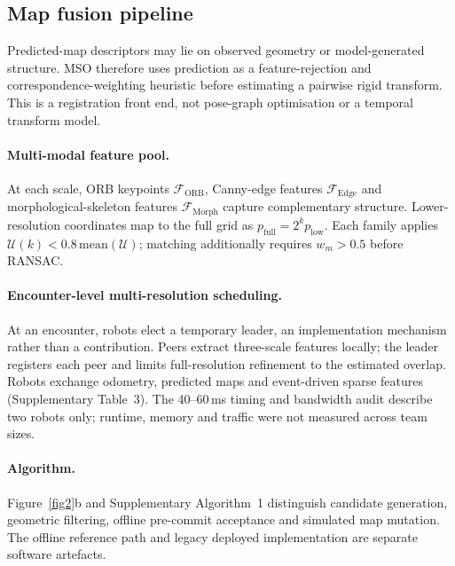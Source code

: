 \documentclass[11pt]{article}
\begin{document}
\subsection{Map fusion pipeline} \label{app:fusion}

Predicted-map descriptors may lie on observed geometry or model-generated structure. MSO therefore uses prediction as a feature-rejection and correspondence-weighting heuristic before estimating a pairwise rigid transform. This is a registration front end, not pose-graph optimisation or a temporal transform model.

\paragraph{Multi-modal feature pool.}
At each scale, ORB keypoints $\mathcal{F}_{\text{ORB}}$, Canny-edge features $\mathcal{F}_{\text{Edge}}$ and morphological-skeleton features $\mathcal{F}_{\text{Morph}}$ capture complementary structure. Lower-resolution coordinates map to the full grid as $p_{\text{full}}=2^{k}p_{\text{low}}$. Each family applies $\mathcal{U}(k)<0.8\,\mathrm{mean}(\mathcal{U})$; matching additionally requires $w_m>0.5$ before RANSAC.

\paragraph{Encounter-level multi-resolution scheduling.}
At an encounter, robots elect a temporary leader, an implementation mechanism rather than a contribution. Peers extract three-scale features locally; the leader registers each peer and limits full-resolution refinement to the estimated overlap. Robots exchange odometry, predicted maps and event-driven sparse features (Supplementary Table~3). The 40--60\,ms timing and bandwidth audit describe two robots only; runtime, memory and traffic were not measured across team sizes.

\paragraph{Algorithm.}
Figure~\ref{fig2}b and Supplementary Algorithm~1 distinguish candidate generation, geometric filtering, offline pre-commit acceptance and simulated map mutation. The offline reference path and legacy deployed implementation are separate software artefacts.
\end{document}
